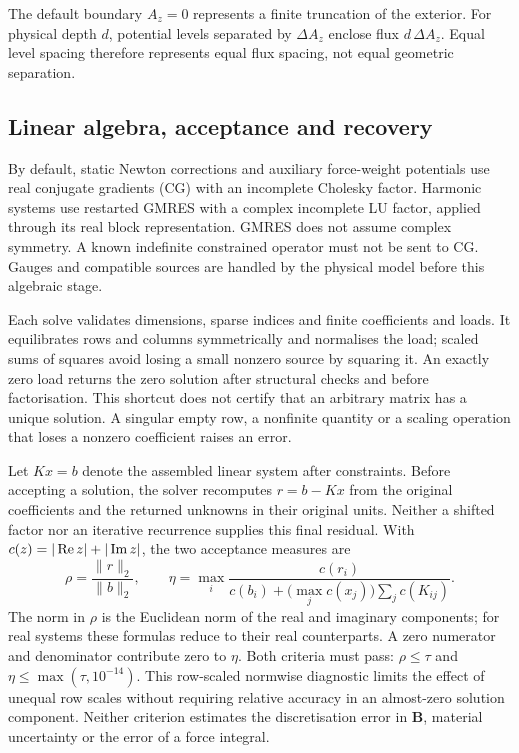 The default boundary $A_z=0$ represents a finite truncation of the
exterior. For physical depth $d$, potential levels separated by $\Delta A_z$
enclose flux $d\,\Delta A_z$. Equal level spacing therefore represents equal
flux spacing, not equal geometric separation.

\subsection{Linear algebra, acceptance and recovery}
\label{sec:linear-acceptance}
By default, static Newton corrections and auxiliary force-weight potentials use real
conjugate gradients (CG) with an incomplete Cholesky factor. Harmonic systems
use restarted GMRES with a complex incomplete LU factor, applied through its
real block representation. GMRES does not assume complex symmetry. A known
indefinite constrained operator must not be sent to CG. Gauges and compatible
sources are handled by the physical model before this algebraic stage.

Each solve validates dimensions, sparse indices and finite coefficients and
loads. It equilibrates rows and columns symmetrically and normalises the load;
scaled sums of squares avoid losing a small nonzero source by squaring it.
An exactly zero load returns the zero solution after structural checks and
before factorisation. This shortcut does not certify that an arbitrary matrix
has a unique solution. A singular empty row, a nonfinite quantity or a scaling
operation that loses a nonzero coefficient raises an error.

Let $Kx=b$ denote the assembled linear system after constraints. Before accepting
a solution, the solver recomputes $r=b-Kx$ from the original coefficients and
the returned unknowns in their original units. Neither a shifted factor nor
an iterative recurrence supplies this final residual. With
$c(z)=|\mathop{\rm Re}z|+|\mathop{\rm Im}z|$, the two acceptance measures are
\[
 \rho=\frac{\|r\|_2}{\|b\|_2},\qquad
 \eta=\max_i\frac{c(r_i)}{c(b_i)+\bigl(\max_j c(x_j)\bigr)\sum_j c(K_{ij})}.
\]
The norm in $\rho$ is the Euclidean norm of the real and imaginary components;
for real systems these formulas reduce to their real counterparts. A zero
numerator and denominator contribute zero to $\eta$. Both criteria must pass:
$\rho\leq\tau$ and $\eta\leq\max(\tau,10^{-14})$.
This row-scaled normwise diagnostic limits the effect of unequal row scales
without requiring relative accuracy in an almost-zero solution component. Neither criterion estimates the discretisation error in $\mathbf B$,
material uncertainty or the error of a force integral.

